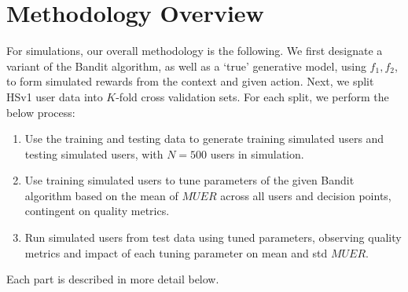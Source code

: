 \section{Methodology Overview}

For simulations, our overall methodology is the following.  We first designate a variant of the Bandit algorithm, as well as a `true' generative model, using $f_1,f_2$, to form simulated rewards from the context and given action.  Next, we split HSv1 user data into $K$-fold cross validation sets.  For each split, we perform the below process:

\begin{enumerate}
	\item Use the training and testing data to generate training simulated users and testing simulated users, with $N = 500$ users in simulation.
	\item Use training simulated users to tune parameters of the given Bandit algorithm based on the mean of $MUER$ across all users and decision points, contingent on quality metrics.
	\item Run simulated users from test data using tuned parameters, observing quality metrics and impact of each tuning parameter on mean and std $MUER$.
\end{enumerate}

Each part is described in more detail below.


